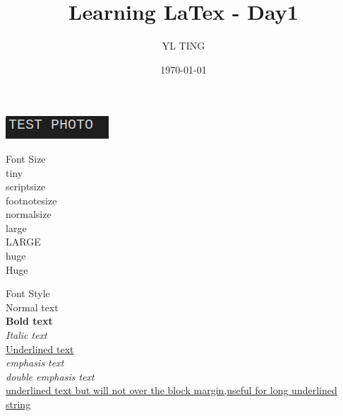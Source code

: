 \documentclass[10pt]{article}
\author{YL TING}
\date{\today}
\title{Learning LaTex - Day1}
\begin{document}
    \maketitle
    \begin{center}
        \includegraphics[width=0.3\linewidth]{test_photo.png}
    \end{center}

    \newpage
    
    \begin{center}
        {\LARGE Font Size}\\[0.25cm]
        {\tiny tiny}\\
        {\scriptsize scriptsize}\\
        {\footnotesize footnotesize}\\
        {\normalsize normalsize}\\
        {\large large}\\
        {\LARGE LARGE}\\
        {\huge huge}\\
        {\Huge Huge}\\[1cm]
    \end{center}

    \begin{center}
        {\LARGE Font Style}\\[0.25cm]
        Normal text\\[0.2cm]
        \textbf{Bold text} \\[0.2cm]
        \textit{Italic text}\\[0.2cm]
        \underline{Underlined text}\\[0.2cm]
        \emph{emphasis text}\\[0.2cm]
        \emph{\emph{double emphasis text}}\\[0.2cm]
        \uline{underlined text but will not over the block margin,useful for long underlined string}\\
        \\[0.2cm]
        \newline %
    \end{center}
\end{document}
